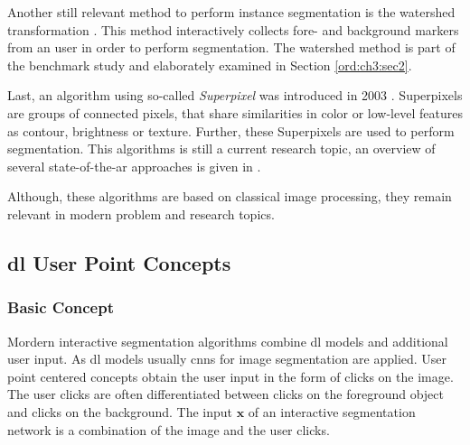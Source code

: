 Another still relevant method to perform instance segmentation is the watershed transformation \cite{VS91-Watershed}.
This method interactively collects fore- and background markers from an user in order to perform segmentation.
The watershed method is part of the benchmark study and elaborately examined in Section \ref{ord:ch3:sec2}.

Last, an algorithm using so-called \textit{Superpixel} was introduced in 2003 \cite{RM03-Superpixel}.
Superpixels are groups of connected pixels, that share similarities in color or low-level features as contour, brightness or texture.
Further, these Superpixels are used to perform segmentation.
This algorithms is still a current research topic, an overview of several state-of-the-ar approaches is given in \cite{SHL16-SuperpixelEvaluation}.
 
Although, these algorithms are based on classical image processing, they remain relevant in modern problem and research topics.


\subsection{\gls{dl} User Point Concepts}\label{ord:ch2:sec3:subsec2}

\subsubsection{Basic Concept}
Mordern interactive segmentation algorithms combine \gls{dl} models and additional user input.
As \gls{dl} models usually \glspl{cnn} for image segmentation are applied.
User point centered concepts obtain the user input in the form of clicks on the image.
The user clicks are often differentiated between clicks on the foreground object and clicks on the background.
The input $\textbf{x}$ of an interactive segmentation network is a combination of the image and the user clicks.

